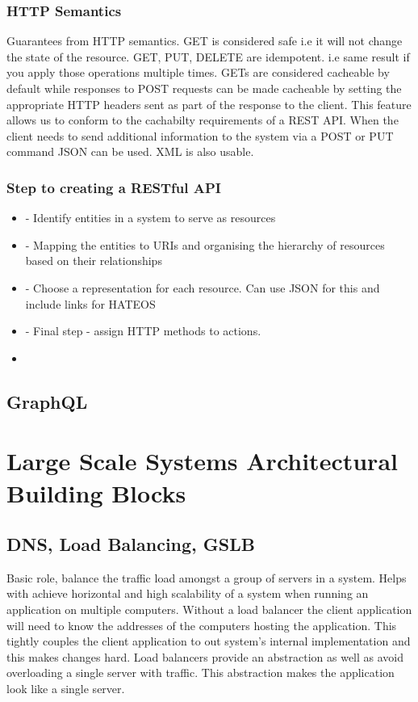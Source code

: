 \documentclass[a4paper, 11pt]{book}
\begin{document}
    \subsection{HTTP Semantics}
    Guarantees from HTTP semantics.
    GET is considered safe i.e it will not change the state of the resource.
    GET, PUT, DELETE are idempotent.
    i.e same result if you apply those operations multiple times.
    GETs are considered cacheable by default while responses to POST requests can be made cacheable by setting the appropriate HTTP headers sent as part of the response to the client.
    This feature allows us to conform to the cachabilty requirements of a REST API.
    When the client needs to send additional information to the system via a POST or PUT command JSON can be used.
    XML is also usable.

    \subsection{Step to creating a RESTful API}
    \begin{itemize}
        \item - Identify entities in a system to serve as resources
        \item - Mapping the entities to URIs and organising the hierarchy of resources based on their relationships
        \item - Choose a representation for each resource. Can use JSON for this and include links for HATEOS
        \item - Final step - assign HTTP methods to actions.
        \item
    \end{itemize}


    \section{GraphQL}

    


    \chapter{Large Scale Systems Architectural Building Blocks}


    \section{DNS, Load Balancing, GSLB}
    Basic role, balance the traffic load amongst a group of servers in a system.
    Helps with achieve horizontal and high scalability of a system when running an application on multiple computers.
    Without a load balancer the client application will need to know the addresses of the computers hosting the application.
    This tightly couples the client application to out system's internal implementation and this makes changes hard.
    Load balancers provide an abstraction as well as avoid overloading a single server with traffic.
    This abstraction makes the application look like a single server.
\end{document}
